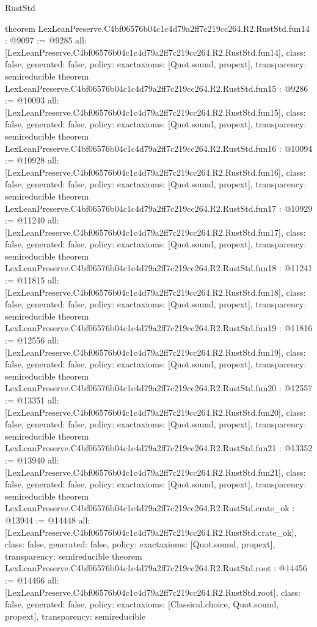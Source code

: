 \begin{lexlean}{RustStd}
\begin{coremodule}
{}
theorem LexLeanPreserve.C4bf06576b04c1c4d79a2ff7c219cc264.R2.RustStd.fun14 : @9097 := @9285 {
  all: [LexLeanPreserve.C4bf06576b04c1c4d79a2ff7c219cc264.R2.RustStd.fun14],
  class: false,
  generated: false,
  policy: exact{axioms: [Quot.sound, propext]},
  transparency: semireducible
}
theorem LexLeanPreserve.C4bf06576b04c1c4d79a2ff7c219cc264.R2.RustStd.fun15 : @9286 := @10093 {
  all: [LexLeanPreserve.C4bf06576b04c1c4d79a2ff7c219cc264.R2.RustStd.fun15],
  class: false,
  generated: false,
  policy: exact{axioms: [Quot.sound, propext]},
  transparency: semireducible
}
theorem LexLeanPreserve.C4bf06576b04c1c4d79a2ff7c219cc264.R2.RustStd.fun16 : @10094 := @10928 {
  all: [LexLeanPreserve.C4bf06576b04c1c4d79a2ff7c219cc264.R2.RustStd.fun16],
  class: false,
  generated: false,
  policy: exact{axioms: [Quot.sound, propext]},
  transparency: semireducible
}
theorem LexLeanPreserve.C4bf06576b04c1c4d79a2ff7c219cc264.R2.RustStd.fun17 : @10929 := @11240 {
  all: [LexLeanPreserve.C4bf06576b04c1c4d79a2ff7c219cc264.R2.RustStd.fun17],
  class: false,
  generated: false,
  policy: exact{axioms: [Quot.sound, propext]},
  transparency: semireducible
}
theorem LexLeanPreserve.C4bf06576b04c1c4d79a2ff7c219cc264.R2.RustStd.fun18 : @11241 := @11815 {
  all: [LexLeanPreserve.C4bf06576b04c1c4d79a2ff7c219cc264.R2.RustStd.fun18],
  class: false,
  generated: false,
  policy: exact{axioms: [Quot.sound, propext]},
  transparency: semireducible
}
theorem LexLeanPreserve.C4bf06576b04c1c4d79a2ff7c219cc264.R2.RustStd.fun19 : @11816 := @12556 {
  all: [LexLeanPreserve.C4bf06576b04c1c4d79a2ff7c219cc264.R2.RustStd.fun19],
  class: false,
  generated: false,
  policy: exact{axioms: [Quot.sound, propext]},
  transparency: semireducible
}
theorem LexLeanPreserve.C4bf06576b04c1c4d79a2ff7c219cc264.R2.RustStd.fun20 : @12557 := @13351 {
  all: [LexLeanPreserve.C4bf06576b04c1c4d79a2ff7c219cc264.R2.RustStd.fun20],
  class: false,
  generated: false,
  policy: exact{axioms: [Quot.sound, propext]},
  transparency: semireducible
}
theorem LexLeanPreserve.C4bf06576b04c1c4d79a2ff7c219cc264.R2.RustStd.fun21 : @13352 := @13940 {
  all: [LexLeanPreserve.C4bf06576b04c1c4d79a2ff7c219cc264.R2.RustStd.fun21],
  class: false,
  generated: false,
  policy: exact{axioms: [Quot.sound, propext]},
  transparency: semireducible
}
theorem LexLeanPreserve.C4bf06576b04c1c4d79a2ff7c219cc264.R2.RustStd.crate_ok : @13944 := @14448 {
  all: [LexLeanPreserve.C4bf06576b04c1c4d79a2ff7c219cc264.R2.RustStd.crate_ok],
  class: false,
  generated: false,
  policy: exact{axioms: [Quot.sound, propext]},
  transparency: semireducible
}
theorem LexLeanPreserve.C4bf06576b04c1c4d79a2ff7c219cc264.R2.RustStd.root : @14456 := @14466 {
  all: [LexLeanPreserve.C4bf06576b04c1c4d79a2ff7c219cc264.R2.RustStd.root],
  class: false,
  generated: false,
  policy: exact{axioms: [Classical.choice, Quot.sound, propext]},
  transparency: semireducible
}


\end{coremodule}
\end{lexlean}
